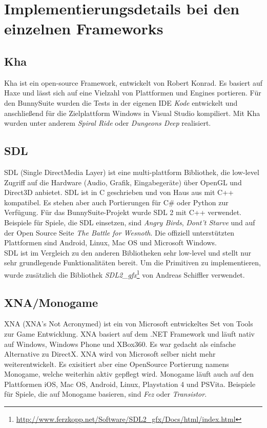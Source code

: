 \section{Implementierungsdetails bei den einzelnen Frameworks}
\subsection{Kha}
Kha ist ein open-source Framework, entwickelt von Robert Konrad. Es basiert auf Haxe und lässt sich auf eine Vielzahl von Plattformen und Engines portieren. Für den BunnySuite wurden die Tests in der eigenen IDE \textit{Kode} entwickelt und anschließend für die Zielplattform Windows in Visual Studio kompiliert. Mit Kha wurden unter anderem \emph{Spiral Ride} oder \emph{Dungeons Deep} realisiert.

\subsection{SDL}
SDL (Single DirectMedia Layer) ist eine multi-plattform Bibliothek, die low-level Zugriff auf die Hardware (Audio, Grafik, Eingabegeräte) über OpenGL und Direct3D anbietet. SDL ist in C geschrieben und von Haus aus mit C++ kompatibel. Es stehen aber auch Portierungen für C\# oder Python zur Verfügung. Für das BunnySuite-Projekt wurde SDL 2 mit C++ verwendet. Beispiele für Spiele, die SDL einsetzen, sind \emph{Angry Birds}, \emph{Dont't Starve} und auf der Open Source Seite \emph{The Battle for Wesnoth}. Die offiziell unterstützten Plattformen sind Android, Linux, Mac OS und Microsoft Windows.\\
SDL ist im Vergleich zu den anderen Bibliotheken sehr low-level und stellt nur sehr grundlegende Funktionalitäten bereit. Um die Primitiven zu implementieren, wurde zusätzlich die Bibliothek \textit{SDL2\_gfx}\footnote{\url{http://www.ferzkopp.net/Software/SDL2\_gfx/Docs/html/index.html}} von Andreas Schiffler verwendet.

\subsection{XNA/Monogame}
XNA (XNA's Not Acronymed) ist ein von Microsoft entwickeltes Set von Tools zur Game Entwicklung. XNA basiert auf dem .NET Framework und läuft nativ auf Windows, Windows Phone und XBox360. Es war gedacht als einfache Alternative zu DirectX. XNA wird von Microsoft selber nicht mehr weiterentwickelt. Es exisitiert aber eine OpenSource Portierung namens Monogame, welche weiterhin aktiv gepflegt wird. Monogame läuft auch auf den Plattformen iOS, Mac OS, Android, Linux, Playstation 4 und PSVita. Beispiele für Spiele, die auf Monogame basieren, sind \emph{Fez} oder \emph{Transistor}.

